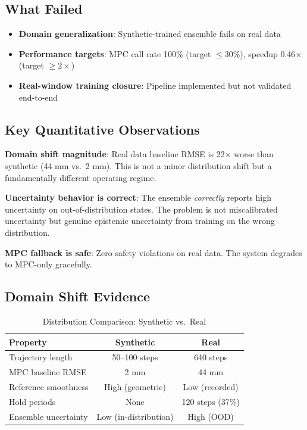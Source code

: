 \documentclass[conference]{IEEEtran}
\begin{document}
\subsection{What Failed}

\begin{itemize}
\item \textbf{Domain generalization}: Synthetic-trained ensemble fails on real data
\item \textbf{Performance targets}: MPC call rate 100\% (target $\leq 30\%$), speedup 0.46$\times$ (target $\geq 2\times$)
\item \textbf{Real-window training closure}: Pipeline implemented but not validated end-to-end
\end{itemize}

\subsection{Key Quantitative Observations}

\textbf{Domain shift magnitude}: Real data baseline RMSE is 22$\times$ worse than synthetic (44 mm vs.~2 mm). This is not a minor distribution shift but a fundamentally different operating regime.

\textbf{Uncertainty behavior is correct}: The ensemble \emph{correctly} reports high uncertainty on out-of-distribution states. The problem is not miscalibrated uncertainty but genuine epistemic uncertainty from training on the wrong distribution.

\textbf{MPC fallback is safe}: Zero safety violations on real data. The system degrades to MPC-only gracefully.

\subsection{Domain Shift Evidence}

\begin{table}[h]
\centering
\caption{Distribution Comparison: Synthetic vs.~Real}
\begin{tabular}{lcc}
\toprule
Property & Synthetic & Real \\
\midrule
Trajectory length & 50--100 steps & 640 steps \\
MPC baseline RMSE & 2 mm & 44 mm \\
Reference smoothness & High (geometric) & Low (recorded) \\
Hold periods & None & 120 steps (37\%) \\
Ensemble uncertainty & Low (in-distribution) & High (OOD) \\
\bottomrule
\end{tabular}
\end{table}
\end{document}
